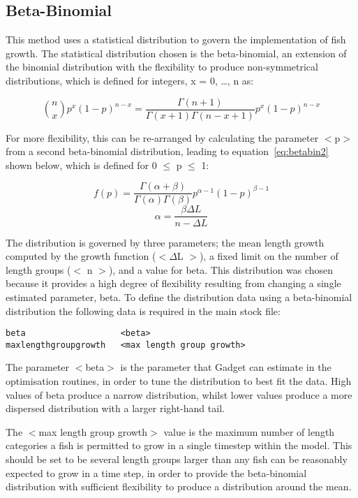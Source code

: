 \documentclass [a4paper, 10pt]{book}
\begin{document}
\subsection{Beta-Binomial}
This method uses a statistical distribution to govern the implementation of fish growth.  The statistical distribution chosen is the beta-binomial, an extension of the binomial distribution with the flexibility to produce non-symmetrical distributions, which is defined for integers, x = 0, \ldots, n as:

\begin{equation}\label{eq:betabin1}
{n \choose x}p^x (1-p)^{n-x} = \frac{\Gamma(n+1)}{\Gamma(x+1)\Gamma(n-x+1)}p^x(1-p)^{n-x}
\end{equation}

For more flexibility, this can be re-arranged by calculating the parameter $<$p$>$ from a second beta-binomial distribution, leading to equation~\ref{eq:betabin2} shown below, which is defined for 0 $\le$ p $\le$ 1:

\begin{equation}\label{eq:betabin2}
f(p)=\frac{\Gamma(\alpha+\beta)}{\Gamma(\alpha)\Gamma(\beta)}p^{\alpha-1}(1-p)^{\beta-1}
\end{equation}
\begin{equation}\label{eq:betabin3}
\alpha=\frac{\beta\Delta L}{n-\Delta L}
\end{equation}

The distribution is governed by three parameters; the mean length growth computed by the growth function ($<\Delta$L $>$), a fixed limit on the number of length groups ($<$ n $>$), and a value for beta.  This distribution was chosen because it provides a high degree of flexibility resulting from changing a single estimated parameter, beta.  To define the distribution data using a beta-binomial distribution the following data is required in the main stock file:

{\small\begin{verbatim}
beta                   <beta>
maxlengthgroupgrowth   <max length group growth>
\end{verbatim}}

The parameter $<$beta$>$ is the parameter that Gadget can estimate in the optimisation routines, in order to tune the distribution to best fit the data.  High values of beta produce a narrow distribution, whilst lower values produce a more dispersed distribution with a larger right-hand tail.

\bigskip
The $<$max length group growth$>$ value is the maximum number of length categories a fish is permitted to grow in a single timestep within the model.  This should be set to be several length groups larger than any fish can be reasonably expected to grow in a time step, in order to provide the beta-binomial distribution with sufficient flexibility to produce a distribution around the mean.
\end{document}

